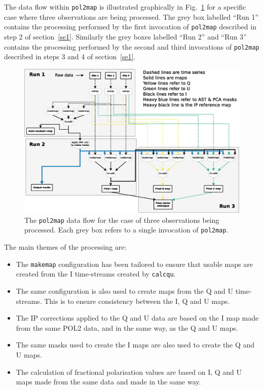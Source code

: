 \documentclass[twoside,11pt]{starlink}
\begin{document}
The data flow within \texttt{pol2map} is illustrated graphically in
Fig.~\ref{fig:flow} for a specific case where three observations are
being processed. The grey box labelled ``Run 1'' contains the processing
performed by the first invocation of \texttt{pol2map} described in step 2
of section~\ref{se1}. Similarly the grey boxes labelled ``Run 2'' and ``Run
3'' contains the processing performed by the second and third invocations
of \texttt{pol2map} described in steps 3 and 4 of section~\ref{se1}.

\begin{figure}
\includegraphics[width=.99\linewidth]{figs/pol2map_flow.eps}
\caption{The \texttt{pol2map} data flow for the case of three
observations being processed. Each grey box refers to a single invocation
of \texttt{pol2map}.}
\label{fig:flow}
\end{figure}

The main themes of the processing are:

\begin{itemize}
\item The \texttt{makemap} configuration has been tailored to ensure that
usable maps are created from the I time-streams created by \texttt{calcqu}.
\item The same configuration is also used to create maps from the Q and U
time-streams. This is to ensure consistency between the I, Q and U maps.
\item The IP corrections applied to the Q and U data are based on the I
map made from the same POL2 data, and in the same way, as the Q and U maps.
\item The same masks used to create the I maps are also used to create
the Q and U maps.
\item The calculation of fractional polarisation values are based on I, Q
and U maps made from the same data and made in the same way.
\end{itemize}
\end{document}
